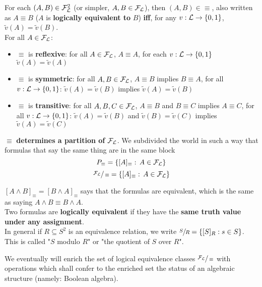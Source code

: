 \documentclass[11pt]{article}
\begin{document}
	For each $(A, B) \in \mathcal{F}_\mathcal{L}^2$ (or simpler, $A, B \in \mathcal{F}_\mathcal{L}$), then $(A, B) \in \equiv$, also written as $A \equiv B$ ($A$ is \textbf{logically equivalent to} $B$) \textbf{iff}, for any $v: \mathcal{L} \rightarrow \{0,1\}$, $\tilde{v}(A) = \tilde{v} (B)$.\\
	
	For all $A \in \mathcal{F}_\mathcal{L}$:
	\begin{itemize}
		\item $\equiv$ is \textbf{reflexive}: for all $A \in \mathcal{F}_\mathcal{L}$, $A \equiv A$, for each $v: \mathcal{L} \rightarrow \{0,1\}$ $\tilde{v} (A) = \tilde{v}(A)$
		
		\item $\equiv$ is \textbf{symmetric}: for all $A,B \in \mathcal{F}_\mathcal{L}$, $A \equiv B$ implies $B \equiv A$, for all $v: \mathcal{L} \rightarrow \{0,1\}$: $\tilde{v}(A) = \tilde{v}(B)$ implies $\tilde{v}(A) = \tilde{v}(B)$
		
		\item $\equiv$ is \textbf{transitive}: for all $A,B,C \in \mathcal{F}_\mathcal{L}$, $A \equiv B$ and $B \equiv C$ implies $A \equiv C$, for all $v: \mathcal{L} \rightarrow \{0,1\}$: $\tilde{v}(A) = \tilde{v}(B)$ and $\tilde{v}(B) = \tilde{v}(C)$ implies $\tilde{v}(A) = \tilde{v}(C)$
	\end{itemize}
	
	\newpage
	
	$\equiv$ \textbf{determines a partition of} $\mathcal{F}_\mathcal{L}$. We subdivided the world in such a way that formulas that say the same thing are in the same block
	$$ P_\equiv = \{[A]_\equiv : \, A \in \mathcal{F}_\mathcal{L}\}$$
	$$ \sfrac{\mathcal{F}_\mathcal{L}}{\equiv} = \{[A]_\equiv : \, A \in \mathcal{F}_\mathcal{L}\}$$
	
	$[A \wedge B]_\equiv = [B \wedge A]_\equiv$ says that the formulas are equivalent, which is the same as saying $A \wedge B \equiv B \wedge A$.\\
	
	Two formulas are \textbf{logically equivalent} if they have the \textbf{same truth value under any assignment}.\\
	
	In general if $R \subseteq S^2$ is an equivalence relation, we write $\sfrac{S}{R} = \{[S]_R : s \in S\}$. This is called "$S$ modulo $R$" or "the quotient of $S$ over $R$".\\
	
	\vfill
	
	We eventually will enrich the set of logical equivalence classes $\sfrac{\mathcal{F}_\mathcal{L}}{\equiv}$ with operations which shall confer to the enriched set the status of an algebraic structure (namely: Boolean algebra).\\
	
	\newpage
	
\end{document}
